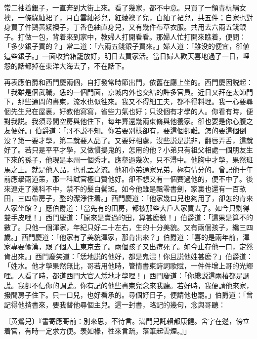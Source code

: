 常二袖着銀子，一直奔到大街上來。看了幾家，都不中意。只買了一領青杭絹女襖，一條綠紬裙子，月白雲紬衫兒，紅綾襖子兒，白紬子裙兒，共五件；自家也對身買了件鵝黄綾襖子，丁香色紬直身兒，又有幾件布草衣服。共用去六兩五錢銀子。打做一包，背着來到家中，教婦人打開看看。那婦人忙打開來瞧着，便問：「多少銀子買的？」常二道：「六兩五錢銀子買來。」婦人道：「雖没的便宜，卻値這些銀子。」一面收拾箱籠放好，明日去買家活。當日婦人歡天喜地過了一日，埋怨的話都掉在東洋大海去了，不在話下。

再表應伯爵和西門慶兩個，自打發常時節出門，依舊在廳上坐的。西門慶因説起：「我雖是個武職，恁的一個門面，京城内外也交結的許多官員。近日又拜在太師門下，那些通問的書柬，流水也似徃來。我又不得細工夫，都不得料理。我一心要尋個先生兒在屋裏，好教他寫寫，省些力氣也好；只没個有才學的人。你看有時，便對我説。我須尋間空房與他住下，每年算還幾兩束脩與他養家。卻也要是你心腹之友便好。」伯爵道：「哥不説不知。你若要别樣卻有，要這個卻難。怎的要這個倒没？第一要才學，第二就要人品了。又要好相處，沒些説是説非，翻唇弄舌，這就好了。若只是平平才學，又做慣搗鬼的，怎用的他？小弟只有祖父相處一個朋友生下來的孫子，他現是本州一個秀才。應擧過幾次，只不淂中。他胸中才學，果然班馬之上。就是他人品，也孔孟之流。他和小弟通家兄弟，極有情分的。曾記他十年前應擧兩道策，那一科試官極口贊他好。卻不想又有一個賽過他的，便不中了。後來連走了幾科不中，禁不的髮白鬢斑。如今他雖是飄零書劍，家裏也還有一百畝田，三四帶房子，整的潔淨住着。」西門慶道：「他家幾口兒也夠用了，卻怎的肯來人家坐館？」應伯爵道：「當先有的田房，都被那些大戶人家買去了。如今只剩得雙手皮哩！」西門慶道：「原來是賣過的田，算甚麽數！」伯爵道：「這果是算不的數了。只他一個渾家，年紀只好二十左右，生的十分美貌。又有兩個孩子，纔三四歲。」西門慶道：「他家有了美貌渾家，那肯出來？」伯爵道：「喜的是兩年前，渾家專要偸漢，跟了個人上東京去了。兩個孩子又出痘死了。如今止存他一口，定然肯出來。」西門慶笑道：「恁地説的他好，都是鬼混！你且説他姓甚麽？」伯爵道：「姓水。他才學果然無比，哥若用他時，管情書柬詩詞歌賦，一件件增上哥的光輝哩。人看了時，都道西門大官人恁地才學哩！」西門慶道：「你纔説這兩樁都是調謊。我卻不信你的調謊。你有記的他些書柬兒念來我聽。若好時，我便請他來家，撥間房子住下。只一口兒，也好看承的。尋個好日子，便請他也罷。」伯爵道：「曾記得他捎書來，要我替他尋個主兒。這一封書，略記的幾句，念與哥聽：

\begin{myquote}
{\marktext〔黄鶯兒〕}『書寄應哥前：別來思，不待言。滿門兒託賴都康健。舍字在邊，傍立着官，有時一定求方便。羡如椽，徃來言疏，落筆起雲煙。』」
\end{myquote}

